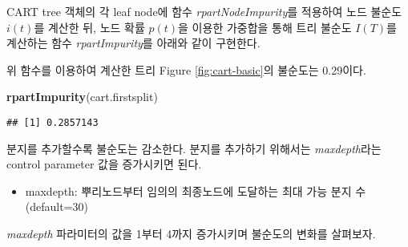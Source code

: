 \documentclass[]{book}
\newenvironment{Shaded}{\begin{snugshade}}{\end{snugshade}}
\newcommand{\ControlFlowTok}[1]{\textcolor[rgb]{0.13,0.29,0.53}{\textbf{#1}}}
\newcommand{\DataTypeTok}[1]{\textcolor[rgb]{0.13,0.29,0.53}{#1}}
\newcommand{\KeywordTok}[1]{\textcolor[rgb]{0.13,0.29,0.53}{\textbf{#1}}}
\newcommand{\NormalTok}[1]{#1}
\newcommand{\OperatorTok}[1]{\textcolor[rgb]{0.81,0.36,0.00}{\textbf{#1}}}
\newcommand{\StringTok}[1]{\textcolor[rgb]{0.31,0.60,0.02}{#1}}
\providecommand{\tightlist}{%
  \setlength{\itemsep}{0pt}\setlength{\parskip}{0pt}}
\begin{document}
CART tree 객체의 각 leaf node에 함수 \emph{rpartNodeImpurity}를 적용하여 노드 불순도 \(i(t)\)를 계산한 뒤, 노드 확률 \(p(t)\)을 이용한 가중합을 통해 트리 불순도 \(I(T)\)를 계산하는 함수 \emph{rpartImpurity}를 아래와 같이 구현한다.

\begin{Shaded}
\end{Shaded}

위 함수를 이용하여 계산한 트리 Figure \ref{fig:cart-basic}의 불순도는 0.29이다.

\begin{Shaded}
\begin{Highlighting}[]
\KeywordTok{rpartImpurity}\NormalTok{(cart.firstsplit)}
\end{Highlighting}
\end{Shaded}

\begin{verbatim}
## [1] 0.2857143
\end{verbatim}

분지를 추가할수록 불순도는 감소한다. 분지를 추가하기 위해서는 \emph{maxdepth}라는 control parameter 값을 증가시키면 된다.

\begin{itemize}
\tightlist
\item
  maxdepth: 뿌리노드부터 임의의 최종노드에 도달하는 최대 가능 분지 수 (default=30)
\end{itemize}

\emph{maxdepth} 파라미터의 값을 1부터 4까지 증가시키며 불순도의 변화를 살펴보자.
\end{document}
